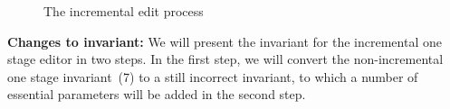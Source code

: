 \documentclass[twoside,epsf]{report}
\begin{document}
\begin{figure}
\begin{small}
\begin{center}
\begin{center}
\begin{scriptsize}
\bigskip \noindent
{}
\end{scriptsize}
\end{center}\caption{ The incremental edit process}\label{inceditprocess} 
\end{center}
\end{small}
\end{figure}


{\bf Changes to invariant: }We will present the invariant for the incremental one stage editor in two steps. In the first step, we will convert the non-incremental one stage invariant~(7) to a still incorrect invariant, to which a number of essential parameters will be added in the second step.
\end{document}
